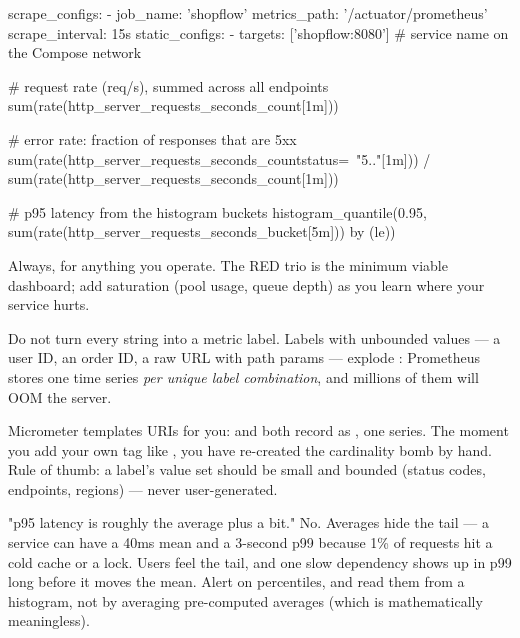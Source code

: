 \begin{yamlbox}
scrape_configs:
  - job_name: 'shopflow'
    metrics_path: '/actuator/prometheus'
    scrape_interval: 15s
    static_configs:
      - targets: ['shopflow:8080']   # service name on the Compose network
\end{yamlbox}

\begin{propsbox}
# request rate (req/s), summed across all endpoints
sum(rate(http_server_requests_seconds_count[1m]))

# error rate: fraction of responses that are 5xx
sum(rate(http_server_requests_seconds_count{status=~"5.."}[1m]))
  / sum(rate(http_server_requests_seconds_count[1m]))

# p95 latency from the histogram buckets
histogram_quantile(0.95,
  sum(rate(http_server_requests_seconds_bucket[5m])) by (le))
\end{propsbox}

 Always, for anything you operate. The RED trio is the minimum viable dashboard; add saturation (pool usage, queue depth) as you learn where your service hurts.

 Do not turn every string into a metric label. Labels with unbounded values --- a user ID, an order ID, a raw URL with path params --- explode : Prometheus stores one time series \emph{per unique label combination}, and millions of them will OOM the server.

\begin{perfnote}
Micrometer templates URIs for you:  and  both record as , one series. The moment you add your own tag like , you have re-created the cardinality bomb by hand. Rule of thumb: a label's value set should be small and bounded (status codes, endpoints, regions) --- never user-generated.
\end{perfnote}

\begin{misconception}
"p95 latency is roughly the average plus a bit." No. Averages hide the tail --- a service can have a 40ms mean and a 3-second p99 because 1\% of requests hit a cold cache or a lock. Users feel the tail, and one slow dependency shows up in p99 long before it moves the mean. Alert on percentiles, and read them from a histogram, not by averaging pre-computed averages (which is mathematically meaningless).
\end{misconception}

